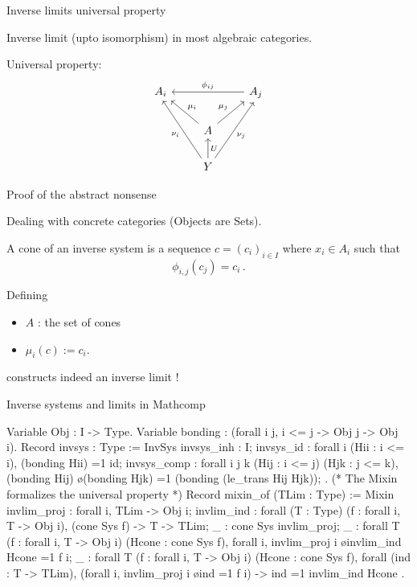\documentclass[compress,11pt]{beamer}
\renewcommand{\emph}[1]{{\color{red} #1}}
\begin{document}
\begin{frame}[fragile]{Inverse limits universal property}

  \begin{THEO}
    Inverse limit  (upto isomorphism) in most
    algebraic categories.
  \bigskip

  Universal property:
\[
\begin{tikzcd}
  A_{i}& & A_{j} \arrow[ll,"\phi_{ij}",swap] \\
  & A \arrow[ul,"\mu_{i}",swap] \arrow[ur,"\mu_{j}"]\\
  & Y \arrow[u,"U",swap]
  \arrow[uul,"\nu_{i}",end anchor={[xshift=0.2em]south}]
  \arrow[uur,"\nu_{j}",end anchor={[xshift=-0.2em]south},swap]
\end{tikzcd}
\]
  \end{THEO}
\end{frame}


\begin{frame}{Proof of the abstract nonsense}

  Dealing with concrete categories (Objects are Sets).
  \bigskip

  \begin{DEFN}
    A \emph{cone} of an inverse system is a sequence $c=(c_i)_{i\in I}$ where
    $x_i\in A_i$ such that \[\phi_{i,j}(c_j) = c_i\,.\]
  \end{DEFN}
  Defining
  \begin{itemize}
  \item $A$ : the set of cones
  \item $\mu_i(c) := c_i$.
  \end{itemize}
  constructs indeed an inverse limit !
\end{frame}


\begin{frame}[fragile]{Inverse systems and limits in Mathcomp}
\begin{coqcode}
Variable Obj : I -> Type.
Variable bonding : (forall i j, i <= j -> Obj j -> Obj i).
Record invsys : Type := InvSys {
      invsys_inh : I;
      invsys_id  : forall i (Hii : i <= i), (bonding Hii) =1 id;
      invsys_comp : forall i j k  (Hij : i <= j) (Hjk : j <= k),
          (bonding Hij) \o (bonding Hjk) =1 (bonding (le_trans Hij Hjk));
  }.
(* The Mixin formalizes the universal property *)
Record mixin_of (TLim : Type) := Mixin {
  invlim_proj : forall i, TLim -> Obj i;
  invlim_ind  : forall (T : Type) (f : forall i, T -> Obj i),
      (cone Sys f) -> T -> TLim;
  _ : cone Sys invlim_proj;
  _ : forall T (f : forall i, T -> Obj i) (Hcone : cone Sys f),
      forall i, invlim_proj i \o invlim_ind Hcone =1 f i;
  _ : forall T (f : forall i, T -> Obj i) (Hcone : cone Sys f),
      forall (ind : T -> TLim),
        (forall i, invlim_proj i \o ind =1 f i) ->
        ind =1 invlim_ind Hcone
  }.
\end{coqcode}
\end{frame}
\end{document}
